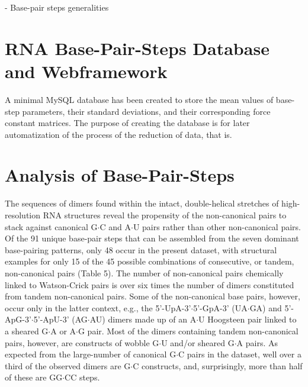 - Base-pair steps generalities






  


\section{RNA Base-Pair-Steps Database and Webframework}
A minimal MySQL database has been  created to store the mean values of
base-step   parameters,   their   standard   deviations,   and   their
corresponding  force constant  matrices. The  purpose of  creating the
database is for  later automatization of the process  of the reduction
of data, that is.

\section{Analysis of Base-Pair-Steps}


The  sequences  of  dimers  found within  the  intact,  double-helical
stretches of  high-resolution RNA structures reveal  the propensity of
the  non-canonical  pairs to  stack  against  canonical G$\cdot$C  and
A$\cdot$U  pairs rather  than  other non-canonical  pairs.  Of the  91
unique base-pair steps  that can be assembled from  the seven dominant
base-pairing  patterns, only  48 occur  in the  present  dataset, with
structural examples  for only  15 of the  45 possible  combinations of
consecutive, or tandem, non-canonical pairs (Table 5). The number of
non-canonical pairs  chemically linked  to Watson-Crick pairs  is over
six times  the number of dimers constituted  from tandem non-canonical
pairs. Some of the non-canonical  base pairs, however, occur only in
the   latter  context,   e.g.,  the   5'-UpA-3'$\cdot$5'-GpA-3'
(UA$\cdot$GA)  and 5'-ApG-3'$\cdot$5'-ApU-3'  (AG$\cdot$AU) dimers
made up of  an A$\cdot$U Hoogsteen pair linked  to a sheared G$\cdot$A
or A$\cdot$G pair. Most  of the dimers containing tandem non-canonical
pairs,  however, are  constructs  of wobble  G$\cdot$U and/or  sheared
G$\cdot$A  pairs.  As  expected  from the  large-number  of  canonical
G$\cdot$C  pairs in the  dataset, well  over a  third of  the observed
dimers are  G$\cdot$C constructs, and, surprisingly,  more than half
of these are GG$\cdot$CC steps.

